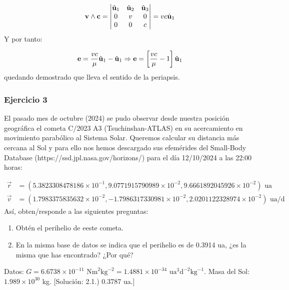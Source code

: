 	\begin{equation}
		\mathbf{v} \wedge \mathbf{c} = \begin{vmatrix}
			\hat{\mathbf{u}}_1 & \hat{\mathbf{u}}_2 & \hat{\mathbf{u}}_3 \\
			0      & v      & 0      \\
			0      & 0      & c
		\end{vmatrix} = v c \hat{\mathbf{u}}_1
	\end{equation}
	Y por tanto:

	\begin{equation}
		\mathbf{e} = \frac{vc}{\mu} \hat{\mathbf{u}}_1 - \hat{\mathbf{u}}_1 \Rightarrow \mathbf{e} = \left[ \frac{vc}{\mu}-1 \right]\hat{\mathbf{u}}_1
	\end{equation}
	quedando demostrado que lleva el sentido de la periapsis.




	\begin{Enunciado}
		\subsubsection{Ejercicio 3}
	El pasado mes de octubre (2024) se pudo observar desde nuestra posición geográfica el cometa C/2023 A3 (Tsuchinshan-ATLAS) en su acercamiento en movimiento parabólico al Sistema Solar. Queremos calcular su distancia más cercana al Sol y para ello nos hemos descargado sus efemérides del Small-Body Database (https://ssd.jpl.nasa.gov/horizons/) para el día 12/10/2024 a las 22:00 horas:

	\begin{align*}
		\vec{r} & = (5.3823308478186\times10^{-1}, 9.0771915790989\times10^{-2}, 9.6661892045926\times10^{-2}) \text{ ua}    \\
		\vec{v} & = (1.7983375835632\times10^{-2}, -1.7986317330981\times10^{-2}, 2.0201122328974\times10^{-2}) \text{ ua/d}
	\end{align*}
    Así, obten/responde a las siguientes preguntas:
    \begin{enumerate}[label=\alph*)]
    \item Obtén el perihelio de eeste cometa.
	\item En la misma base de datos se indica que el perihelio es de 0.3914 ua, ¿es la misma que has encontrado? ¿Por qué?
	\end{enumerate}
	Datos: $G = 6.6738 \times 10^{-11} \text{ Nm}^2\text{kg}^{-2} = 1.4881 \times 10^{-34} \text{ ua}^3\text{d}^{-2}\text{kg}^{-1}$. Masa del Sol: $1.989 \times 10^{30}$ kg. [Solución: 2.1.) 0.3787 ua.]
	 
	\end{Enunciado}

